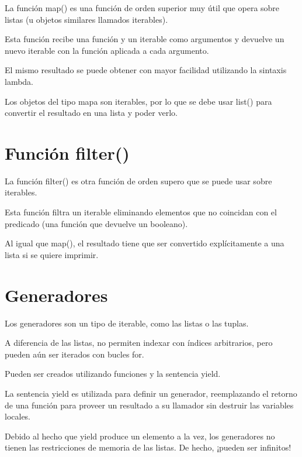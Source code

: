\documentclass{report}
\begin{document}
La función map() es una función de orden superior muy útil que opera sobre listas (u objetos similares llamados iterables).

Esta función recibe una función y un iterable como argumentos y devuelve un nuevo iterable con la función aplicada a cada argumento.


El mismo resultado se puede obtener con mayor facilidad utilizando la sintaxis lambda.


Los objetos del tipo mapa son iterables, por lo que se debe usar list() para convertir el resultado en una lista y poder verlo.

\section{Función filter()}

La función filter() es otra función de orden supero que se puede usar sobre iterables.

Esta función filtra un iterable eliminando elementos que no coincidan con el predicado (una función que devuelve un booleano).


Al igual que map(), el resultado tiene que ser convertido explícitamente a una lista si se quiere imprimir.

\section{Generadores}

Los generadores son un tipo de iterable, como las listas o las tuplas.

A diferencia de las listas, no permiten indexar con índices arbitrarios, pero pueden aún ser iterados con bucles for.

Pueden ser creados utilizando funciones y la sentencia yield.



La sentencia yield es utilizada para definir un generador, reemplazando el retorno de una función para proveer un resultado a su llamador sin destruir las variables locales.

Debido al hecho que yield produce un elemento a la vez, los generadores no tienen las restricciones de memoria de las listas. De hecho, ¡pueden ser infinitos!
\end{document}

